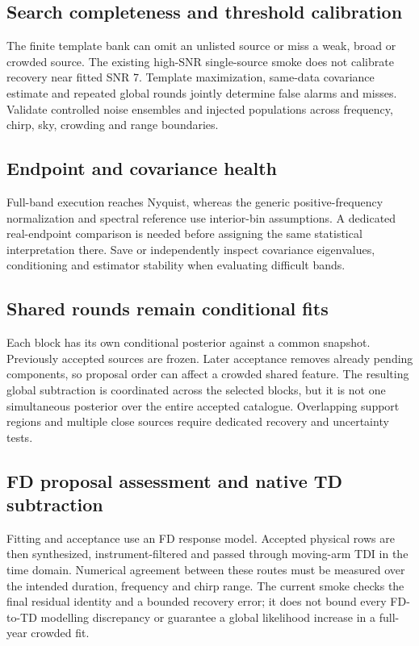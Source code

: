\documentclass[11pt,a4paper]{article}
\begin{document}
\subsection{Search completeness and threshold calibration}

The finite template bank can omit an unlisted source or miss a weak, broad or crowded
source. The existing high-SNR single-source smoke does not calibrate recovery
near fitted SNR 7. Template maximization,
same-data covariance estimate and repeated global rounds jointly determine
false alarms and misses. Validate controlled noise ensembles and injected
populations across frequency, chirp, sky, crowding and range boundaries.

\subsection{Endpoint and covariance health}

Full-band execution reaches Nyquist, whereas the generic positive-frequency
normalization and spectral reference use interior-bin assumptions. A dedicated
real-endpoint comparison is needed before assigning the same statistical
interpretation there. Save or independently inspect covariance eigenvalues,
conditioning and estimator stability when evaluating difficult bands.

\subsection{Shared rounds remain conditional fits}

Each block has its own conditional posterior against a common snapshot.
Previously accepted sources are frozen. Later acceptance removes already
pending components, so proposal order can affect a crowded shared feature.
The resulting global subtraction is coordinated across the selected blocks,
but it is not one simultaneous posterior over the entire accepted catalogue.
Overlapping support regions and multiple close sources require dedicated
recovery and uncertainty tests.

\subsection{FD proposal assessment and native TD subtraction}

Fitting and acceptance use an FD response model. Accepted physical rows are
then synthesized, instrument-filtered and passed through moving-arm TDI in
the time domain. Numerical agreement between these routes must be measured
over the intended duration, frequency and chirp range. The current smoke
checks the final residual identity and a bounded recovery error; it does not
bound every FD-to-TD modelling discrepancy or guarantee a global likelihood
increase in a full-year crowded fit.
\end{document}
